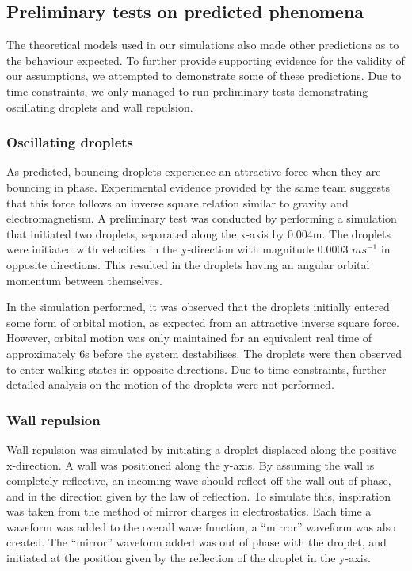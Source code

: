 \subsection{Preliminary tests on predicted phenomena}
The theoretical models used in our simulations also made other predictions as to the behaviour expected. To further provide supporting evidence for the validity of our  assumptions, we attempted to demonstrate some of these predictions. Due to time constraints, we only managed to run preliminary tests demonstrating oscillating droplets and wall repulsion.

\subsubsection{Oscillating droplets}

As predicted, \cite{brady2014bouncing} bouncing droplets experience an attractive force when they are bouncing in phase. Experimental evidence provided by the same team suggests that this force follows an inverse square relation similar to gravity and electromagnetism. A preliminary test was conducted by performing a simulation that initiated two droplets, separated along the x-axis by 0.004m. The droplets were initiated with velocities in the y-direction with magnitude 0.0003 $ms^{-1}$ in opposite directions. This resulted in the droplets having an angular orbital momentum between themselves.

In the simulation performed, it was observed that the droplets initially entered some form of orbital motion, as expected from an attractive inverse square force. However, orbital motion was only maintained for an equivalent real time of approximately 6s before the system destabilises. The droplets were then observed to enter walking states in opposite directions. Due to time constraints, further detailed analysis on the motion of the droplets were not performed. 

\subsubsection{Wall repulsion}

Wall repulsion was simulated by initiating a droplet displaced along the positive x-direction. A wall was positioned along the y-axis. By assuming the wall is completely reflective, an incoming wave should reflect off the wall out of phase, and in the direction given by the law of reflection. To simulate this, inspiration was taken from the method of mirror charges in electrostatics. Each time a waveform was added to the overall wave function, a “mirror” waveform was also created. The “mirror” waveform added was out of phase with the droplet, and initiated at the position given by the reflection of the droplet in the y-axis.

